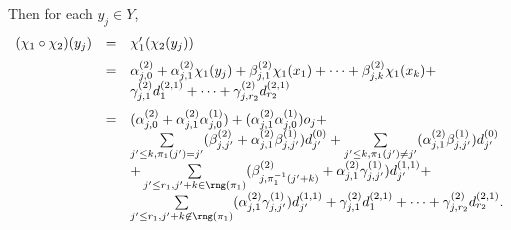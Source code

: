 Then
for each $y_j \in Y$,
\[
\begin{array}{l c l}
\medskip
(\chi_1 \circ \chi_2)(y_j) & = & \chi'_1(\chi_2(y_j))\\
%
& = &  \alpha^{(2)}_{j,0} + \alpha^{(2)}_{j,1} \chi_1(y_j) + \beta^{(2)}_{j,1} \chi_1(x_1) + \dots + \beta^{(2)}_{j,k} \chi_1(x_k) +\\
\medskip
& & \gamma^{(2)}_{j,1} d^{(2,1)}_1 +\dots + \gamma^{(2)}_{j,r_2} d^{(2,1)}_{r_2} \\
%
& =  & (\alpha^{(2)}_{j,0}+\alpha^{(2)}_{j,1} \alpha^{(1)}_{j,0})+ (\alpha^{(2)}_{j,1}\alpha^{(1)}_{j,0}) o_j + \\
%
& & \sum \limits_{j' \le k, \pi_1(j')=j'} (\beta^{(2)}_{j,j'}+\alpha^{(2)}_{j,1} \beta^{(1)}_{j,j'}) d^{(0)}_{j'} + \sum \limits_{j' \le k, \pi_1(j') \neq j'} (\alpha^{(2)}_{j,1} \beta^{(1)}_{j,j'}) d^{(0)}_{j'}  \\
%
& & + \sum \limits_{j' \le r_1, j' + k \in \rng(\pi_1)} (\beta^{(2)}_{j,\pi_1^{-1}(j'+k)}+\alpha^{(2)}_{j,1} \gamma^{(1)}_{j,j'}) d^{(1,1)}_{j'} +\\
%
& & \sum \limits_{j' \le r_1, j' + k \not \in \rng(\pi_1)} (\alpha^{(2)}_{j,1} \gamma^{(1)}_{j,j'}) d^{(1,1)}_{j'} + 
 \gamma^{(2)}_{j,1} d^{(2,1)}_1 +\dots + \gamma^{(2)}_{j,r_2} d^{(2,1)}_{r_2}.
\end{array}
\] 



